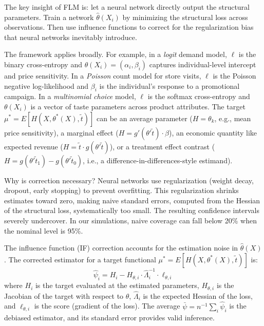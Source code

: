 The key insight of FLM is: let a neural network directly output the structural parameters. Train a network $\hat{\theta}(X_i)$ by minimizing the structural loss across observations. Then use influence functions to correct for the regularization bias that neural networks inevitably introduce.

The framework applies broadly. For example, in a \emph{logit} demand model, $\ell$ is the binary cross-entropy and $\theta(X_i) = (\alpha_i, \beta_i)$ captures individual-level intercept and price sensitivity. In a \emph{Poisson} count model for store visits, $\ell$ is the Poisson negative log-likelihood and $\beta_i$ is the individual's response to a promotional campaign. In a \emph{multinomial choice} model, $\ell$ is the softmax cross-entropy and $\theta(X_i)$ is a vector of taste parameters across product attributes.
The target $\mu^* = E[H(X, \theta^*(X), \tilde{t})]$ can be an average parameter ($H = \theta_k$, e.g., mean price sensitivity), a marginal effect ($H = g'(\theta'\tilde{t}) \cdot \beta$), an economic quantity like expected revenue ($H = \tilde{t} \cdot g(\theta'\tilde{t})$), or a treatment effect contrast ($H = g(\theta'\tilde{t}_1) - g(\theta'\tilde{t}_0)$, i.e., a difference-in-differences-style estimand).

Why is correction necessary? Neural networks use regularization (weight decay, dropout, early stopping) to prevent overfitting. This regularization shrinks estimates toward zero, making naive standard errors, computed from the Hessian of the structural loss, systematically too small. The resulting confidence intervals severely undercover. In our simulations, naive coverage can fall below 20\% when the nominal level is 95\%.

The influence function (IF) correction accounts for the estimation noise in $\hat{\theta}(X)$. The corrected estimator for a target functional $\mu^* = E[H(X, \theta^*(X), \tilde{t})]$ is:
\begin{equation}\label{eq:psi_intro}
    \hat{\psi}_i = H_i - H_{\theta,i} \cdot \hat{\Lambda}_i^{-1} \cdot \ell_{\theta,i}
\end{equation}
where $H_i$ is the target evaluated at the estimated parameters, $H_{\theta,i}$ is the Jacobian of the target with respect to $\theta$, $\hat{\Lambda}_i$ is the expected Hessian of the loss, and $\ell_{\theta,i}$ is the score (gradient of the loss). The average $\bar{\psi} = n^{-1}\sum_i \hat{\psi}_i$ is the debiased estimator, and its standard error provides valid inference.

